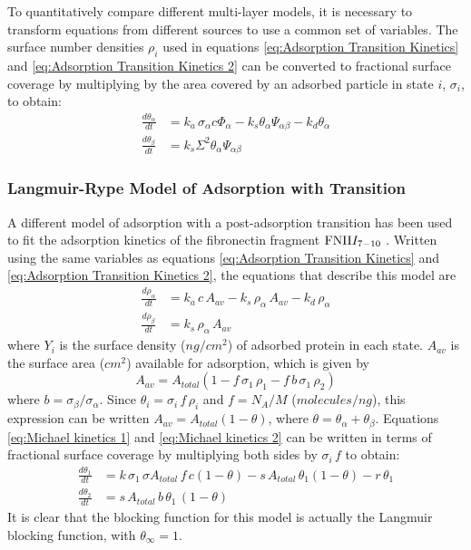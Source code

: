 To quantitatively compare different multi-layer models, it is necessary
to transform equations from different sources to use a common set
of variables. The surface number densities $\rho_{i}$ used in equations
\ref{eq:Adsorption Transition Kinetics} and \ref{eq:Adsorption Transition Kinetics 2}
can be converted to fractional surface coverage by multiplying by
the area covered by an adsorbed particle in state $i$, $\sigma_{i}$,
to obtain:\begin{align}
\frac{d\theta_{\alpha}}{dt} & =k_{a}\,\sigma_{\alpha}c\Phi_{\alpha}-k_{s}\theta_{\alpha}\Psi_{\alpha\beta}-k_{d}\theta_{\alpha}\label{eq:dtheta_alpha dt}\\
\frac{d\theta_{\beta}}{dt} & =k_{s}\Sigma^{2}\theta_{\alpha}\Psi_{\alpha\beta}\label{eq:dtheta_beta dt}\end{align}



\subsubsection{Langmuir-Rype Model of Adsorption with Transition}

A different model of adsorption with a post-adsorption transition
has been used to fit the adsorption kinetics of the fibronectin fragment
$\textrm{FNII\ensuremath{I_{7-10}}}$ \cite{Michael2003}. Written
using the same variables as equations \ref{eq:Adsorption Transition Kinetics}
and \ref{eq:Adsorption Transition Kinetics 2}, the equations that
describe this model are\begin{align}
\frac{d\rho_{\alpha}}{dt} & =k_{a}\, c\, A_{av}-k_{s}\,\rho_{\alpha}\, A_{av}-k_{d}\,\rho_{\alpha}\label{eq:Michael kinetics 1}\\
\frac{d\rho_{\beta}}{dt} & =k_{s}\,\rho_{\alpha}\, A{}_{av}\label{eq:Michael kinetics 2}\end{align}
where $Y_{i}$ is the surface density ($ng/cm^{2}$) of adsorbed protein
in each state. $A_{av}$ is the surface area ($cm^{2}$) available
for adsorption, which is given by\[
A_{av}=A_{total}\left(1-f\,\sigma_{1}\,\rho_{1}-f\, b\,\sigma_{1}\,\rho_{2}\right)\]
where $b=\sigma_{\beta}/\sigma_{\alpha}$. Since $\theta_{i}=\sigma_{i}\, f\,\rho_{i}$
and $f=N_{A}/M$ ($molecules/ng$), this expression can be written
$A_{av}=A_{total}\left(1-\theta\right)$, where $\theta=\theta_{\alpha}+\theta_{\beta}$.
Equations \ref{eq:Michael kinetics 1} and \ref{eq:Michael kinetics 2}
can be written in terms of fractional surface coverage by multiplying
both sides by $\sigma_{i}\, f$ to obtain:\begin{align}
\frac{d\theta_{1}}{dt} & =k\,\sigma_{1}\,\sigma A_{total}\, f\, c\left(1-\theta\right)-s\, A_{total}\,\theta{}_{1}\left(1-\theta\right)-r\,\theta_{1}\label{eq:Langmuir two stage 1}\\
\frac{d\theta_{2}}{dt} & =s\, A_{total}\, b\,\theta_{1}\,\left(1-\theta\right)\label{eq:Langmuir two stage 2}\end{align}
It is clear that the blocking function for this model is actually
the Langmuir blocking function, with $\theta_{\infty}=1$.


